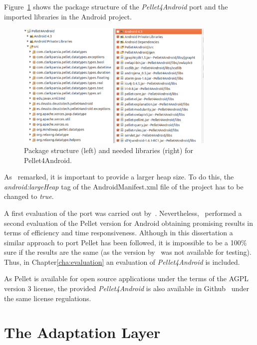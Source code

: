 Figure~\ref{fig:pellet4android} shows the package structure of the
\textit{Pellet4Android} port and the imported libraries in the Android project.
% 

\begin{figure}[H]
\centering
\includegraphics[width=0.85\textwidth]{pellet4android.pdf}
\caption{Package structure (left) and needed libraries (right) for Pellet4Android.}
\label{fig:pellet4android}
\end{figure}


As~\citet{yus_android_2013} remarked, it is important to provide a larger heap
size. To do this, the \textit{android:largeHeap} tag of the AndroidManifest.xml 
file of the project has to be changed to \textit{true}.

A first evaluation of the port was carried out by~\citet{yus_android_2013}.
Nevertheless,~\citet{bobed_android_2014} performed a second evaluation of the
Pellet version for Android obtaining promising results in terms of efficiency
and time responsiveness. Although in this dissertation a similar approach to port 
Pellet has been followed, it is impossible to be a 100\% sure if the results are 
the same (as the version by~\citet{yus_android_2013} was not available for testing). 
Thus, in Chapter\ref{cha:evaluation} an evaluation of \textit{Pellet4Android} is 
included.

As Pellet is available for open source applications under the terms of the AGPL
version 3 license, the provided \textit{Pellet4Android} is also available in
Github~\citep{pellet4android} under the same license regulations.


\section{The Adaptation Layer}
\label{sec:adaptation_layer}


